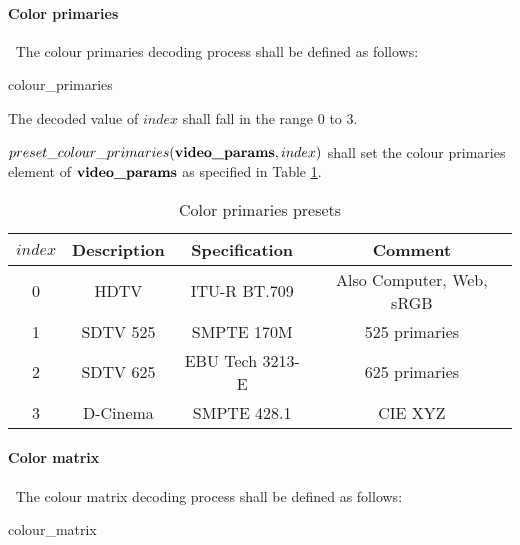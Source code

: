\paragraph{Color primaries}
\label{colourprimaries}
$\ $\newline
The colour primaries decoding process shall be defined as follows:

\begin{pseudo}{colour\_primaries}{\VideoParams}
\bsEND
\end{pseudo}

The decoded value of $index$ shall fall in the range 0 to 3.

 $preset\_colour\_primaries(\textbf{video\_params},index)$ shall set the colour primaries 
element of $\textbf{video\_params}$ as specified
in Table \ref{table:primariesvalues}.

\begin{table}[!ht]
\centering
\begin{tabular}{|c|c|c|c|}
\hline
\rowcolor[gray]{0.75}$index$ &  {\bf Description} & {\bf Specification} & {\bf Comment}      \\
\hline
0       &  HDTV & ITU-R BT.709 & Also Computer, Web, sRGB \\ 
\hline
1       &  SDTV 525 & SMPTE 170M & 525 primaries          \\
\hline
2       &  SDTV 625 & EBU Tech 3213-E & 625 primaries  \\
\hline
3       &  D-Cinema & SMPTE 428.1 & CIE XYZ              \\
\hline
\end{tabular}
\caption{Color primaries presets}\label{table:primariesvalues}
\end{table}

\paragraph{Color matrix}
\label{colourmatrix}
$\ $\newline
The colour matrix decoding process shall be defined as follows:

\begin{pseudo}{colour\_matrix}{}
\bsEND
\end{pseudo}

